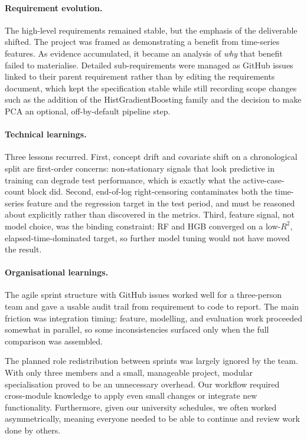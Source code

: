\documentclass[runningheads]{llncs}
\begin{document}
\paragraph{Requirement evolution.}
The high-level requirements remained stable, but the emphasis of the deliverable
shifted. The project was framed as demonstrating a benefit from time-series
features. As evidence accumulated, it became an analysis of \emph{why} that
benefit failed to materialise. Detailed sub-requirements were managed as GitHub
issues linked to their parent requirement rather than by editing the
requirements document, which kept the specification stable while still recording
scope changes such as the addition of the HistGradientBoosting family and the
decision to make PCA an optional, off-by-default pipeline step.

\paragraph{Technical learnings.}
Three lessons recurred. First, concept drift and covariate shift on a
chronological split are first-order concerns: non-stationary signals that look
predictive in training can degrade test performance, which is exactly what the
active-case-count block did. Second, end-of-log right-censoring contaminates
both the time-series feature and the regression target in the test period, and
must be reasoned about explicitly rather than discovered in the metrics. Third,
feature signal, not model choice, was the binding constraint: RF and HGB
converged on a low-$R^2$, elapsed-time-dominated target, so further model tuning
would not have moved the result.

\paragraph{Organisational learnings.}
The agile sprint structure with GitHub issues worked
well for a three-person team and gave a usable audit trail from requirement to
code to report. The main friction was integration timing: feature, modelling,
and evaluation work proceeded somewhat in parallel, so some inconsistencies surfaced only when the full comparison was assembled.

The planned role redistribution between sprints was largely ignored by the team. With only three members and a small, manageable project, modular specialisation proved to be an unnecessary overhead. Our workflow required cross-module knowledge to apply even small changes or integrate new functionality. Furthermore, given our university schedules, we often worked asymmetrically, meaning everyone needed to be able to continue and review work done by others.
\end{document}
